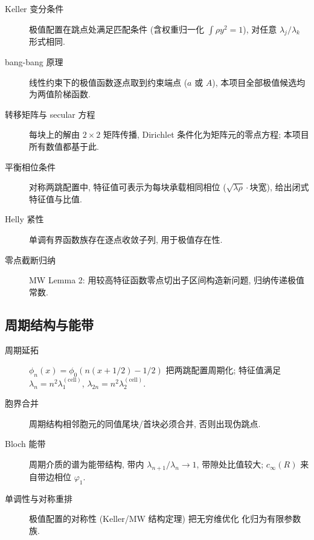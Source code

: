 \documentclass[UTF8]{ctexart}
\begin{document}
\begin{description}
	\item[Keller 变分条件] 极值配置在跳点处满足匹配条件 (含权重归一化
		$\int \rho y^2 = 1$), 对任意 $\lambda_j/\lambda_k$ 形式相同.
	\item[bang-bang 原理] 线性约束下的极值函数逐点取到约束端点 ($a$ 或 $A$),
		本项目全部极值候选均为两值阶梯函数.
	\item[转移矩阵与 secular 方程] 每块上的解由 $2\times 2$ 矩阵传播,
		Dirichlet 条件化为矩阵元的零点方程; 本项目所有数值都基于此.
	\item[平衡相位条件] 对称两跳配置中, 特征值可表示为每块承载相同相位
		($\sqrt{\lambda\rho}\cdot\text{块宽}$), 给出闭式特征值与比值.
	\item[Helly 紧性] 单调有界函数族存在逐点收敛子列, 用于极值存在性.
	\item[零点截断归纳] MW Lemma 2: 用较高特征函数零点切出子区间构造新问题,
		归纳传递极值常数.
\end{description}

\subsection{周期结构与能带}

\begin{description}
	\item[周期延拓] $\phi_n(x) = \phi_0(n(x+1/2)-1/2)$ 把两跳配置周期化;
		特征值满足 $\lambda_n = n^2\lambda_1^{(\text{cell})}$, $\lambda_{2n} = n^2\lambda_2^{(\text{cell})}$.
	\item[胞界合并] 周期结构相邻胞元的同值尾块/首块必须合并, 否则出现伪跳点.
	\item[Bloch 能带] 周期介质的谱为能带结构, 带内 $\lambda_{n+1}/\lambda_n \to 1$,
		带隙处比值较大; $c_{\infty}(R)$ 来自带边相位 $\varphi_1$.
	\item[单调性与对称重排] 极值配置的对称性 (Keller/MW 结构定理) 把无穷维优化
		化归为有限参数族.
\end{description}
\end{document}
